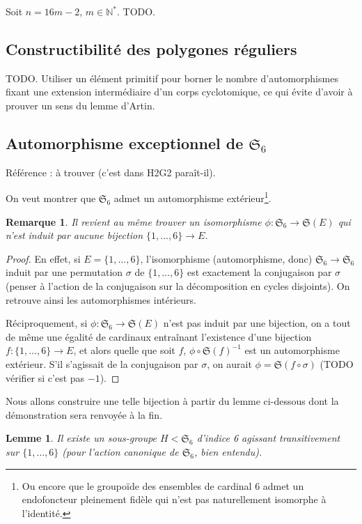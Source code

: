 \documentclass[a4paper, 11pt]{article}
\def\N{\mathbb{N}}
\def\Sigmap{\mathfrak{S}}
\newtheorem*{lemma}{Lemme}
\newtheorem*{remark}{Remarque}
\begin{document}
Soit $n = 16m - 2$, $m \in \N^*$. TODO.


\subsection{Constructibilité des polygones réguliers}

TODO. Utiliser un élément primitif pour borner le nombre d'automorphismes fixant
une extension intermédiaire d'un corps cyclotomique, ce qui évite d'avoir à
prouver un sens du lemme d'Artin.

\subsection{Automorphisme exceptionnel de $\Sigmap_6$}

Référence : à trouver (c'est dans H2G2 paraît-il).

On veut montrer que $\Sigmap_6$ admet un automorphisme extérieur\footnote{Ou
  encore que le groupoïde des ensembles de cardinal 6 admet un endofoncteur
  pleinement fidèle qui n'est pas naturellement isomorphe à l'identité.}.

\begin{remark}
  Il revient au même trouver un isomorphisme $\phi : \Sigmap_6 \to \Sigmap(E)$
  qui n'est induit par aucune bijection $\{1,\ldots,6\} \to E$.
\end{remark}
\begin{proof}
  En effet, si $E = \{1,\ldots,6\}$, l'isomorphisme (automorphisme, donc)
  $\Sigmap_6 \to \Sigmap_6$ induit par une permutation $\sigma$ de
  $\{1,\ldots,6\}$ est exactement la conjugaison par $\sigma$ (penser à l'action
  de la conjugaison sur la décomposition en cycles disjoints). On retrouve ainsi
  les automorphismes intérieurs.

  Réciproquement, si $\phi : \Sigmap_6 \to \Sigmap(E)$ n'est pas induit par une
  bijection, on a tout de même une égalité de cardinaux entraînant l'existence
  d'une bijection $f : \{1,\ldots,6\} \to E$, et alors quelle que soit $f$,
  $\phi \circ \Sigmap(f)^{-1}$ est un automorphisme extérieur. S'il s'agissait
  de la conjugaison par $\sigma$, on aurait $\phi = \Sigmap(f \circ \sigma)$
  (TODO vérifier si c'est pas $-1$).
\end{proof}

Nous allons construire une telle bijection à partir du lemme ci-dessous dont la
démonstration sera renvoyée à la fin.

\begin{lemma}
  Il existe un sous-groupe $H < \Sigmap_6$ d'indice 6 agissant transitivement
  sur $\{1,\ldots,6\}$ (pour l'action canonique de $\Sigmap_6$, bien entendu).
\end{lemma}
\end{document}
